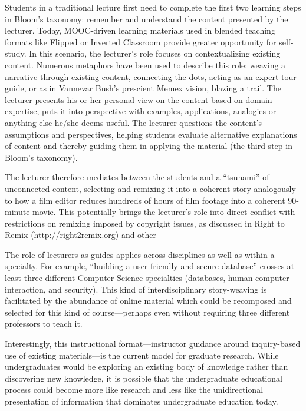 Students in a traditional lecture first need to complete the first two
learning steps in Bloom's taxonomy: remember and understand the content
presented by the lecturer.
Today, MOOC-driven learning materials used in blended teaching formats
like Flipped or Inverted Classroom provide greater opportunity for
self-study.
In this scenario, the lecturer's role focuses on contextualizing
existing content.
Numerous metaphors have been used to describe this role: weaving a
narrative through existing content, connecting the dots, acting as an
expert tour guide, or as in Vannevar Bush's prescient Memex vision,
blazing a trail.
The lecturer presents his or her personal view on the content based on
domain expertise, puts it into perspective with examples, applications,
analogies or anything else he/she deems useful. The lecturer questions
the content's assumptions and perspectives, helping students evaluate
alternative explanations of content and thereby guiding them in applying
the material (the third step in Bloom’s taxonomy).

The lecturer therefore mediates between  the students and
a ``tsunami'' of unconnected content, selecting 
and remixing it into  a coherent story analogously to how
a film editor reduces hundreds of hours of film footage into a coherent
90-minute movie.
This potentially brings the lecturer's role into direct conflict
with restrictions on remixing imposed by copyright issues, as
discussed in Right to Remix (http://right2remix.org) and other

The role of lecturers as guides applies across disciplines as well as within a specialty.  For example, ``building a user-friendly and secure
database''  crosses at least three different Computer Science specialties
(databases, human-computer interaction, and security). 
This kind of interdisciplinary
story-weaving is facilitated by the abundance of online material which
could be recomposed and selected for this kind of course---perhaps even
without requiring three different professors to teach it.

Interestingly, this instructional format---instructor guidance around
inquiry-based use of existing materials---is the current model for
graduate research.  While undergraduates would be exploring an existing
body of knowledge rather than discovering new knowledge, it is possible
that the undergraduate educational process could become more like
research and less like the unidirectional presentation of information
that dominates undergraduate education today.


